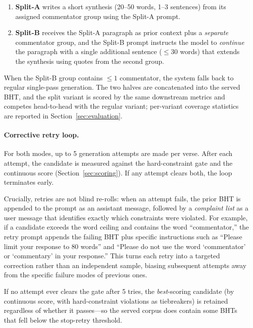\begin{enumerate}[nosep,leftmargin=*]
    \item \textbf{Split-A} writes a short synthesis (20--50 words, 1--3 sentences) from its assigned commentator group using the Split-A prompt.
    \item \textbf{Split-B} receives the Split-A paragraph as prior context plus a \emph{separate} commentator group, and the Split-B prompt instructs the model to \emph{continue} the paragraph with a single additional sentence ($\leq$30 words) that extends the synthesis using quotes from the second group.
\end{enumerate}

\noindent When the Split-B group contains $\leq 1$ commentator, the system falls back to regular single-pass generation. The two halves are concatenated into the served BHT, and the split variant is scored by the same downstream metrics and competes head-to-head with the regular variant; per-variant coverage statistics are reported in Section~\ref{sec:evaluation}.

\paragraph{Corrective retry loop.} For both modes, up to 5 generation attempts are made per verse. After each attempt, the candidate is measured against the hard-constraint gate and the continuous score (Section~\ref{sec:scoring}). If any attempt clears both, the loop terminates early.

Crucially, retries are not blind re-rolls: when an attempt fails, the prior BHT is appended to the prompt as an assistant message, followed by a \emph{complaint list} as a user message that identifies exactly which constraints were violated. For example, if a candidate exceeds the word ceiling and contains the word ``commentator,'' the retry prompt appends the failing BHT plus specific instructions such as ``Please limit your response to 80 words'' and ``Please do not use the word `commentator' or `commentary' in your response.'' This turns each retry into a targeted correction rather than an independent sample, biasing subsequent attempts away from the specific failure modes of previous ones.

If no attempt ever clears the gate after 5 tries, the \emph{best}-scoring candidate (by continuous score, with hard-constraint violations as tiebreakers) is retained regardless of whether it passes---so the served corpus does contain some BHTs that fell below the stop-retry threshold.


